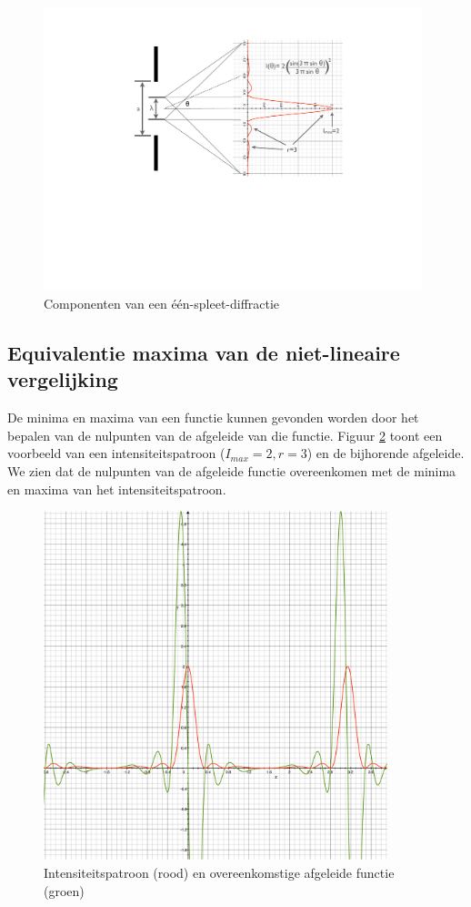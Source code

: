 \documentclass[12pt,a4paper]{article}
\begin{document}
\begin{figure}[h]
\begin{center}
 \includegraphics[width=110mm]{resources/single-slit-diffraction-components.pdf}
 \caption{Componenten van een \'e\'en-spleet-diffractie}
  \label{fig:single-slit-diffraction-components}
\end{center}
\end{figure}

\subsection{Equivalentie maxima van de niet-lineaire vergelijking}

De minima en maxima van een functie kunnen gevonden worden door het bepalen van de nulpunten van de afgeleide van die functie. Figuur \ref{fig:maxima} toont een voorbeeld van een intensiteitspatroon ($I_{max}=2, r=3$) en de bijhorende afgeleide. We zien dat de nulpunten van de afgeleide functie overeenkomen met de minima en maxima van het intensiteitspatroon.

\begin{figure}
\begin{center}
 \includegraphics[width=100mm]{resources/maxima.pdf}
 \caption{Intensiteitspatroon (rood) en overeenkomstige afgeleide functie (groen)}
  \label{fig:maxima}
\end{center}
\end{figure}
\end{document}
